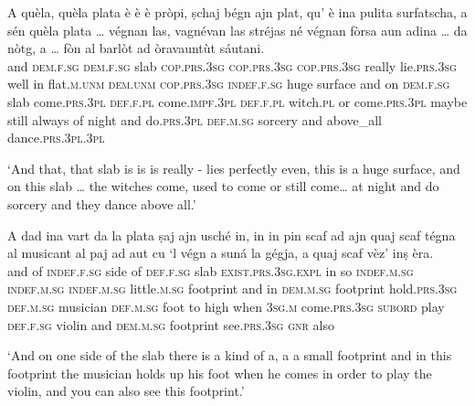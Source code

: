 \begin{linenumbers}
\gll    A quèla, quèla plata è è è pròpi, ṣchaj bégn ajn plat, qu’ è ina pulita surfatscha, a sén quèla plata … végnan las, vagnévan las stréjas né végnan fòrsa aun adina … da nòtg, a … fòn al barlòt ad òravauntùt sáutani.\\
and \textsc{dem.f.sg} \textsc{dem.f.sg} slab \textsc{cop.prs.3sg} \textsc{cop.prs.3sg} \textsc{cop.prs.3sg} really lie.\textsc{prs.3sg} well in flat.\textsc{m.unm} \textsc{dem.unm} \textsc{cop.prs.3sg} \textsc{indef.f.sg} huge surface and on \textsc{dem.f.sg} slab {} come.\textsc{prs.3pl}  \textsc{def.f.pl} come.\textsc{impf.3pl} \textsc{def.f.pl} witch.\textsc{pl} or come.\textsc{prs.3pl} maybe still always {} of night and {} do.\textsc{prs.3pl} \textsc{def.m.sg} sorcery and above\_all dance.\textsc{prs.3pl.3pl}\\
\end{linenumbers}
\medskip
\glt `And that, that slab is is is really - lies perfectly even, this is a huge surface, and on this slab … the witches come, used to come or still come… at night and do sorcery and they dance above all.'
\medskip

\begin{linenumbers}
	\gll A dad ina vart da la plata ṣaj ajn usché in, in in pin scaf ad ajn quaj scaf tégna\footnotemark{} al musicant al paj ad aut cu `l végn a suná la gégja, a quaj scaf vèz’ inṣ èra.\\
and of \textsc{indef.f.sg} side of \textsc{def.f.sg} slab \textsc{exist.prs.3sg.expl} in so \textsc{indef.m.sg} \textsc{indef.m.sg} \textsc{indef.m.sg} little.\textsc{m.sg} footprint and in \textsc{dem.m.sg} footprint hold.\textsc{prs.3sg} \textsc{def.m.sg} musician \textsc{def.m.sg} foot to high when \textsc{3sg.m} come.\textsc{prs.3sg} \textsc{subord} play \textsc{def.f.sg} violin and \textsc{dem.m.sg} footprint see.\textsc{prs.3sg} \textsc{gnr} also\\
\end{linenumbers}
\medskip
\glt `And on one side of the slab there is a kind of a, a a small footprint and in this footprint the musician holds up his foot when he comes in order to play the violin, and you can also see this footprint.'
\medskip

